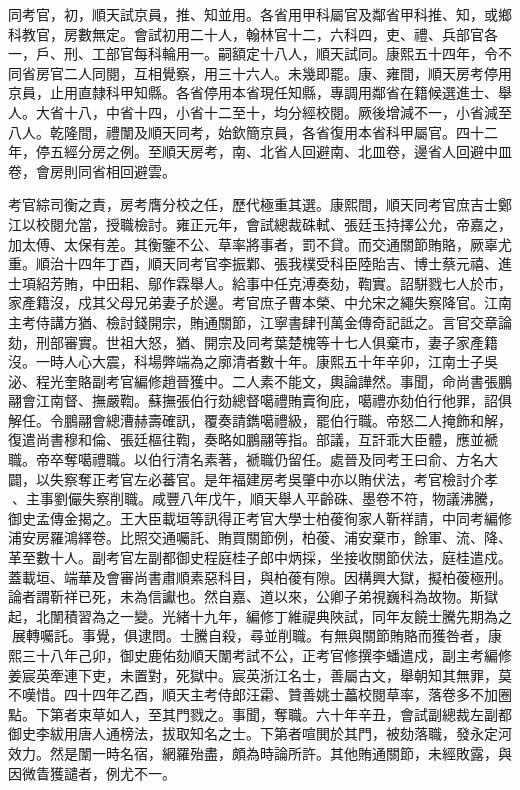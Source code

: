 \begin{pinyinscope}
同考官，初，順天試京員，推、知並用。各省用甲科屬官及鄰省甲科推、知，或鄉科教官，房數無定。會試初用二十人，翰林官十二，六科四，吏、禮、兵部官各一，戶、刑、工部官每科輪用一。嗣額定十八人，順天試同。康熙五十四年，令不同省房官二人同閱，互相覺察，用三十六人。未幾即罷。康、雍間，順天房考停用京員，止用直隸科甲知縣。各省停用本省現任知縣，專調用鄰省在籍候選進士、舉人。大省十八，中省十四，小省十二至十，均分經校閱。厥後增減不一，小省減至八人。乾隆間，禮闈及順天同考，始欽簡京員，各省復用本省科甲屬官。四十二年，停五經分房之例。至順天房考，南、北省人回避南、北皿卷，邊省人回避中皿卷，會房則同省相回避雲。

考官綜司衡之責，房考膺分校之任，歷代極重其選。康熙間，順天同考官庶吉士鄭江以校閱允當，授職檢討。雍正元年，會試總裁硃軾、張廷玉持擇公允，帝嘉之，加太傅、太保有差。其衡鑒不公、草率將事者，罰不貸。而交通關節賄賂，厥辜尤重。順治十四年丁酉，順天同考官李振鄴、張我樸受科臣陸貽吉、博士蔡元禧、進士項紹芳賄，中田耜、鄔作霖舉人。給事中任克溥奏劾，鞫實。詔駢戮七人於市，家產籍沒，戍其父母兄弟妻子於邊。考官庶子曹本榮、中允宋之繩失察降官。江南主考侍講方猶、檢討錢開宗，賄通關節，江寧書肆刊萬金傳奇記詆之。言官交章論劾，刑部審實。世祖大怒，猶、開宗及同考葉楚槐等十七人俱棄市，妻子家產籍沒。一時人心大震，科場弊端為之廓清者數十年。康熙五十年辛卯，江南士子吳泌、程光奎賂副考官編修趙晉獲中。二人素不能文，輿論譁然。事聞，命尚書張鵬翮會江南督、撫嚴鞫。蘇撫張伯行劾總督噶禮賄賣徇庇，噶禮亦劾伯行他罪，詔俱解任。令鵬翮會總漕赫壽確訊，覆奏請鐫噶禮級，罷伯行職。帝怒二人掩飾和解，復遣尚書穆和倫、張廷樞往鞫，奏略如鵬翮等指。部議，互訐乖大臣體，應並褫職。帝卒奪噶禮職。以伯行清名素著，褫職仍留任。處晉及同考王曰俞、方名大闢，以失察奪正考官左必蕃官。是年福建房考吳肇中亦以賄伏法，考官檢討介孝、主事劉儼失察削職。咸豐八年戊午，順天舉人平齡硃、墨卷不符，物議沸騰，御史孟傳金揭之。王大臣載垣等訊得正考官大學士柏葰徇家人靳祥請，中同考編修浦安房羅鴻繹卷。比照交通囑託、賄買關節例，柏葰、浦安棄市，餘軍、流、降、革至數十人。副考官左副都御史程庭桂子郎中炳採，坐接收關節伏法，庭桂遣戍。蓋載垣、端華及會審尚書肅順素惡科目，與柏葰有隙。因構興大獄，擬柏葰極刑。論者謂靳祥已死，未為信讞也。然自嘉、道以來，公卿子弟視巍科為故物。斯獄起，北闈積習為之一變。光緒十九年，編修丁維禔典陜試，同年友饒士騰先期為之展轉囑託。事覺，俱逮問。士騰自殺，尋並削職。有無與關節賄賂而獲咎者，康熙三十八年己卯，御史鹿佑劾順天闈考試不公，正考官修撰李蟠遣戍，副主考編修姜宸英牽連下吏，未置對，死獄中。宸英浙江名士，善屬古文，舉朝知其無罪，莫不嘆惜。四十四年乙酉，順天主考侍郎汪霦、贊善姚士藟校閱草率，落卷多不加圈點。下第者束草如人，至其門戮之。事聞，奪職。六十年辛丑，會試副總裁左副都御史李紱用唐人通榜法，拔取知名之士。下第者喧閧於其門，被劾落職，發永定河效力。然是闈一時名宿，網羅殆盡，頗為時論所許。其他賄通關節，未經敗露，與因微眚獲譴者，例尤不一。


\end{pinyinscope}

